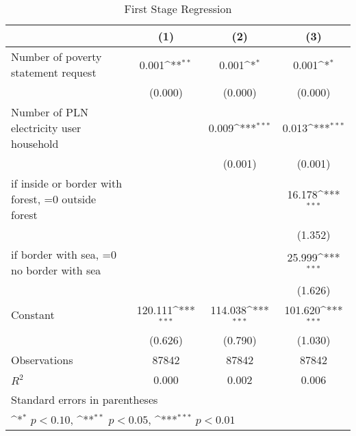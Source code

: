 \begin{table}[htbp]\centering
\def\sym#1{\ifmmode^{#1}\else\(^{#1}\)\fi}
\caption{First Stage Regression}
\begin{tabular}{l*{3}{c}}
\toprule
                    &\multicolumn{1}{c}{(1)}         &\multicolumn{1}{c}{(2)}         &\multicolumn{1}{c}{(3)}         \\
\midrule
Number of poverty statement request&       0.001\sym{**} &       0.001\sym{*}  &       0.001\sym{*}  \\
                    &     (0.000)         &     (0.000)         &     (0.000)         \\
\addlinespace
Number of PLN electricity user household&                     &       0.009\sym{***}&       0.013\sym{***}\\
                    &                     &     (0.001)         &     (0.001)         \\
\addlinespace
=1 if inside or border with forest, =0 outside forest&                     &                     &      16.178\sym{***}\\
                    &                     &                     &     (1.352)         \\
\addlinespace
=1 if border with sea, =0 no border with sea&                     &                     &      25.999\sym{***}\\
                    &                     &                     &     (1.626)         \\
\addlinespace
Constant            &     120.111\sym{***}&     114.038\sym{***}&     101.620\sym{***}\\
                    &     (0.626)         &     (0.790)         &     (1.030)         \\
\midrule
Observations        &       87842         &       87842         &       87842         \\
\(R^{2}\)           &       0.000         &       0.002         &       0.006         \\
\bottomrule
\multicolumn{4}{l}{\footnotesize Standard errors in parentheses}\\
\multicolumn{4}{l}{\footnotesize \sym{*} \(p<0.10\), \sym{**} \(p<0.05\), \sym{***} \(p<0.01\)}\\
\end{tabular}
\end{table}
